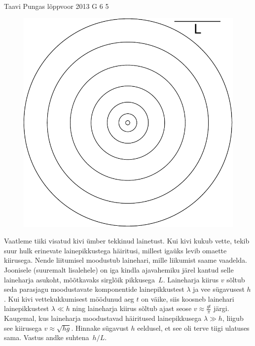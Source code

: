 \documentclass[11pt]{article}
\begin{document}
{%
{Taavi Pungas} %
{lõppvoor} %
{2013} %
{G 6} %
{5} %
{
\ifStatement
\begin{figure}%
\includegraphics[width=\linewidth]{2013-v3g-06-lained}%
\end{figure}
Vaatleme tiiki visatud kivi ümber tekkinud lainetust. Kui kivi kukub vette,
tekib suur hulk erinevate lainepikkustega häiritusi, millest igaüks levib
omaette kiirusega. Nende liitumisel moodustub lainehari, mille liikumist
saame vaadelda. Joonisele (suuremalt lisalehele) on iga kindla ajavahemiku järel kantud selle
laineharja asukoht, mõõtkavaks sirglõik pikkusega~$L$. Laineharja kiirus $v$
sõltub seda parasjagu moodustavate komponentide lainepikkustest $\lambda$ ja vee
sügavusest $h$. Kui kivi vettekukkumisest möödunud aeg $t$ on väike, siis
koosneb lainehari lainepikkustest $\lambda \ll h$ ning laineharja kiirus sõltub
ajast seose $v \approx \frac{gt}{\pi}$ järgi. Kaugemal, kus laineharja
moodustavad häiritused lainepikkusega $\lambda \gg h$, liigub see kiirusega $v
\approx \sqrt{hg}$. Hinnake sügavust $h$ eeldusel, et see oli terve tiigi
ulatuses sama. Vastus andke suhtena~$h/L$.
\fi
}

}
\end{document}
